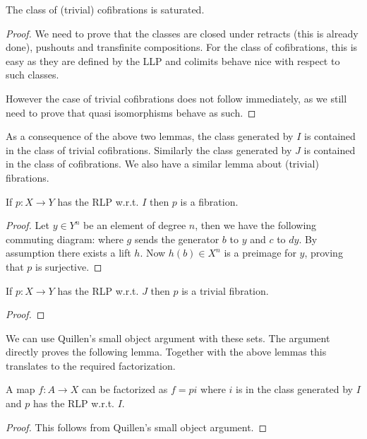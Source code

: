 \begin{lemma}
	The class of (trivial) cofibrations is saturated.
\end{lemma}
\begin{proof}
	We need to prove that the classes are closed under retracts (this is already done), pushouts and transfinite compositions. For the class of cofibrations, this is easy as they are defined by the LLP and colimits behave nice with respect to such classes. 

	However the case of trivial cofibrations does not follow immediately, as we still need to prove that quasi isomorphisms behave as such.
\end{proof}

As a consequence of the above two lemmas, the class generated by $I$ is contained in the class of trivial cofibrations. Similarly the class generated by $J$ is contained in the class of cofibrations. We also have a similar lemma about (trivial) fibrations.

\begin{lemma}
	If $p: X \to Y$ has the RLP w.r.t. $I$ then $p$ is a fibration.
\end{lemma}
\begin{proof}
	Let $y \in Y^n$ be an element of degree $n$, then we have the following commuting diagram:
	where $g$ sends the generator $b$ to $y$ and $c$ to $dy$. By assumption there exists a lift $h$. Now $h(b) \in X^n$ is a preimage for $y$, proving that $p$ is surjective.
\end{proof}

\begin{lemma}
	If $p: X \to Y$ has the RLP w.r.t. $J$ then $p$ is a trivial fibration.
\end{lemma}
\begin{proof}
\end{proof}

We can use Quillen's small object argument with these sets. The argument directly proves the following lemma. Together with the above lemmas this translates to the required factorization.

\begin{lemma}
	A map $f: A \to X$ can be factorized as $f = pi$ where $i$ is in the class generated by $I$ and $p$ has the RLP w.r.t. $I$.
\end{lemma}
\begin{proof}
	This follows from Quillen's small object argument. 
\end{proof}

